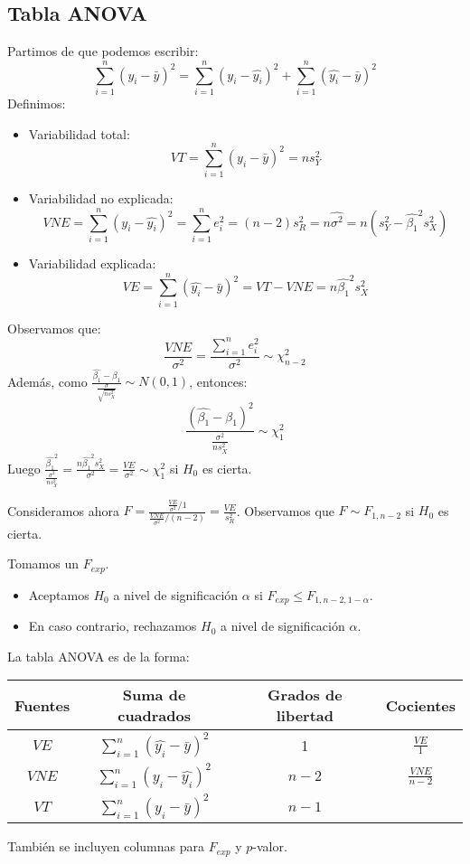 \documentclass{report}
\theoremstyle{remark}
\theoremstyle{remark}
\theoremstyle{remark}
\theoremstyle{definition}
\theoremstyle{definition}
\theoremstyle{definition}
\begin{document}
\subsection*{Tabla ANOVA}
Partimos de que podemos escribir:
$$\sum_{i=1}^n (y_i - \bar{y})^2 = \sum_{i=1}^n (y_i - \hat{y_i})^2 + \sum_{i=1}^n (\hat{y_i} - \bar{y})^2$$
Definimos:
\begin{itemize}
    \item Variabilidad total:
          $$VT = \sum_{i=1}^n (y_i - \bar{y})^2 = ns_Y^2$$
    \item Variabilidad no explicada:
          $$VNE = \sum_{i=1}^n (y_i - \hat{y_i})^2 = \sum_{i=1}^n e_i^2 = (n-2)s_R^2 = n\hat{\sigma^2} = n(s_Y^2 - \hat{\beta_1}^2s_X^2)$$
    \item Variabilidad explicada:
          $$VE = \sum_{i=1}^n (\hat{y_i} - \bar{y})^2 = VT - VNE = n\hat{\beta_1}^2 s_X^2$$
\end{itemize}
Observamos que:
$$\frac{VNE}{\sigma^2} = \frac{\sum_{i=1}^n e_i^2}{\sigma^2} \sim \chi^2_{n-2}$$
Además, como $\frac{\hat{\beta_1} - \beta_1}{\frac{\sigma}{\sqrt{ns_X^2}}} \sim N(0,1)$, entonces:
$$\frac{(\hat{\beta_1} - \beta_1)^2}{\frac{\sigma^2}{ns_X^2}} \sim \chi^2_1$$
Luego $\frac{\hat{\beta_1}^2}{\frac{\sigma^2}{ns_X^2}} = \frac{n\hat{\beta_1}^2s_X^2}{\sigma^2} = \frac{VE}{\sigma^2} \sim \chi^2_1$ si $H_0$ es cierta.

Consideramos ahora $F = \frac{\frac{VE}{\sigma^2} / 1}{\frac{VNE}{\sigma^2} / (n-2)} = \frac{VE}{s_R^2}$.
Observamos que $F \sim F_{1, n-2}$ si $H_0$ es cierta.

Tomamos un $F_{exp}$.
\begin{itemize}
    \item Aceptamos $H_0$ a nivel de significación $\alpha$ si $F_{exp} \leq F_{1, n-2, 1-\alpha}$.
    \item En caso contrario, rechazamos $H_0$ a nivel de significación $\alpha$.
\end{itemize}

La tabla ANOVA es de la forma:
\begin{center}
    \begin{tabular}{ c | c | c | c }
        Fuentes & Suma de cuadrados                   & Grados de libertad & Cocientes         \\
        \hline
        $VE$    & $\sum_{i=1}^n(\hat{y_i}-\bar{y})^2$ & 1                  & $\frac{VE}{1}$    \\
        $VNE$   & $\sum_{i=1}^n(y_i - \hat{y_i})^2$   & $n-2$              & $\frac{VNE}{n-2}$ \\
        $VT$    & $\sum_{i=1}^n(y_i - \bar{y})^2$     & $n-1$
    \end{tabular}
\end{center}
También se incluyen columnas para $F_{exp}$ y $p$-valor.
\end{document}
